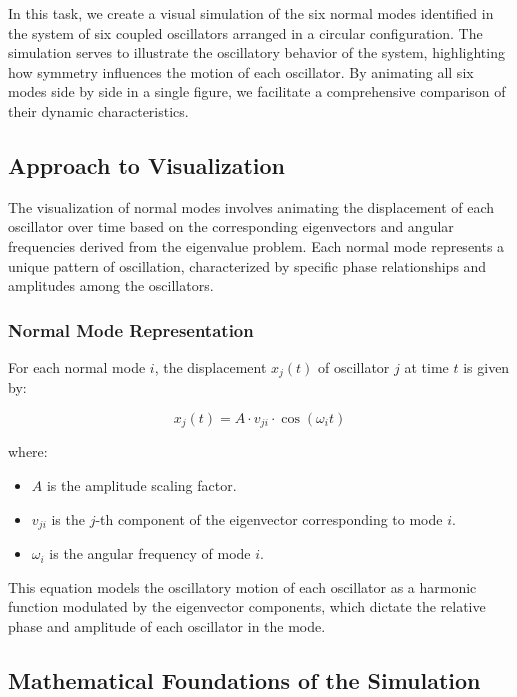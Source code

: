 \documentclass[12pt]{report} %
\begin{document}
In this task, we create a visual simulation of the six normal modes identified in the system of six coupled oscillators arranged in a circular configuration. The simulation serves to illustrate the oscillatory behavior of the system, highlighting how symmetry influences the motion of each oscillator. By animating all six modes side by side in a single figure, we facilitate a comprehensive comparison of their dynamic characteristics.

\subsection{Approach to Visualization}
\label{subsec:part2_task3_approach}

The visualization of normal modes involves animating the displacement of each oscillator over time based on the corresponding eigenvectors and angular frequencies derived from the eigenvalue problem. Each normal mode represents a unique pattern of oscillation, characterized by specific phase relationships and amplitudes among the oscillators.

\subsubsection{Normal Mode Representation}
\label{subsubsec:part2_task3_normal_mode_representation}

For each normal mode \( i \), the displacement \( x_j(t) \) of oscillator \( j \) at time \( t \) is given by:

\[
x_j(t) = A \cdot v_{ji} \cdot \cos(\omega_i t)
\]

where:
\begin{itemize}
    \item \( A \) is the amplitude scaling factor.
    \item \( v_{ji} \) is the \( j \)-th component of the eigenvector corresponding to mode \( i \).
    \item \( \omega_i \) is the angular frequency of mode \( i \).
\end{itemize}

This equation models the oscillatory motion of each oscillator as a harmonic function modulated by the eigenvector components, which dictate the relative phase and amplitude of each oscillator in the mode.

\subsection{Mathematical Foundations of the Simulation}
\label{subsec:part2_task3_math_foundations}
\end{document}

